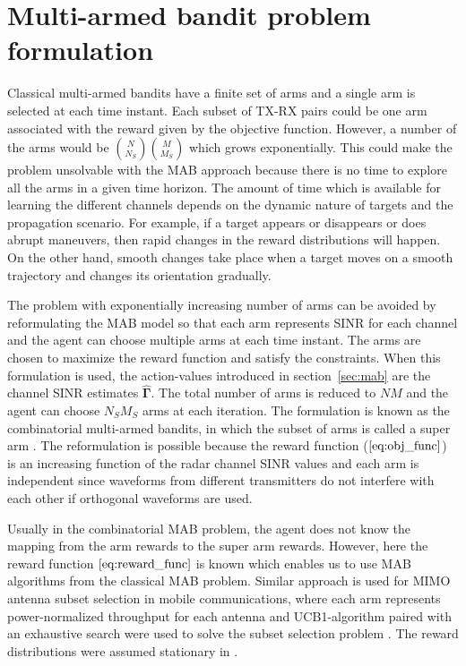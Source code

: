 \documentclass[conference]{IEEEtran}
\newcommand{\vsinrb}{\widehat{\boldsymbol{\Gamma}}}
\begin{document}
\section{Multi-armed bandit problem formulation}
\label{sec:fmab}

Classical multi-armed bandits have a finite set of arms and a single arm is selected at each time instant.
Each subset of TX-RX pairs could be one arm associated with the reward given by the objective function.
However, a number of the arms would be $\binom{N}{N_S}\binom{M}{M_S}$ which grows exponentially. This could make the problem unsolvable with the MAB approach because there is no time to explore all the arms in a given time horizon.
The amount of time which is available for learning the different channels depends on the dynamic nature of targets and the propagation scenario.
For example, if a target appears or disappears or does abrupt maneuvers, then rapid changes in the reward distributions will happen. 
On the other hand, smooth changes take place when a target moves on a smooth trajectory and changes its orientation gradually.

The problem with exponentially increasing number of arms can be avoided by reformulating the MAB model so that each arm represents SINR for each channel and the agent can choose multiple arms at each time instant.
The arms are chosen to maximize the reward function and satisfy the constraints.
When this formulation is used, the action-values introduced in section~\ref{sec:mab} are the channel SINR estimates $\vsinrb$.
The total number of arms is reduced to $NM$ and the agent can choose $N_S M_S$ arms at each iteration.
The formulation is known as the combinatorial multi-armed bandits, in which the subset of arms is called a super arm \cite{Chen2014}.
The reformulation is possible because the reward function ($\ref{eq:obj_func}$) is an increasing function of the radar channel SINR values and each arm is independent since waveforms from different transmitters do not interfere with each other if orthogonal waveforms are used.

Usually in the combinatorial MAB problem, the agent does not know the mapping from the arm rewards to the super arm rewards.
However, here the reward function $\eqref{eq:reward_func}$ is known which enables us to use MAB algorithms from the classical MAB problem.
Similar approach is used for MIMO antenna subset selection in mobile communications, where each arm represents power-normalized throughput for each antenna and UCB1-algorithm paired with an exhaustive search were used to solve the subset selection problem \cite{Mukherjee2012}.
The reward distributions were assumed stationary in \cite{Mukherjee2012}.  
\end{document}
